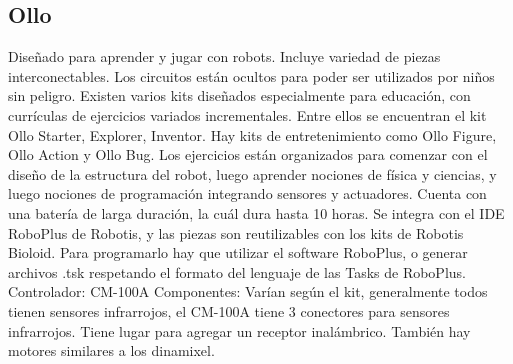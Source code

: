 \subsection{Ollo}
Diseñado para aprender y jugar con robots. Incluye variedad de piezas interconectables. 
Los circuitos están ocultos para poder ser utilizados por niños sin peligro. 
Existen varios kits diseñados especialmente para educación, con currículas de ejercicios variados incrementales. Entre ellos se encuentran el kit Ollo Starter, Explorer, Inventor. Hay kits de entretenimiento como Ollo Figure, Ollo Action y Ollo Bug.
Los ejercicios están organizados para comenzar con el diseño de la estructura del robot, luego aprender nociones de física y ciencias, y luego nociones de programación integrando sensores y actuadores.
Cuenta con una batería de larga duración, la cuál dura hasta 10 horas.
Se integra con el IDE RoboPlus de Robotis, y las piezas son reutilizables con los kits de Robotis Bioloid.
Para programarlo hay que utilizar el software RoboPlus, o generar archivos .tsk respetando el formato del lenguaje de las Tasks de RoboPlus.
Controlador:
CM-100A
Componentes:
Varían según el kit, generalmente todos tienen sensores infrarrojos, el CM-100A tiene 3 conectores para sensores infrarrojos. Tiene lugar para agregar un receptor inalámbrico. También hay motores similares a los dinamixel.

